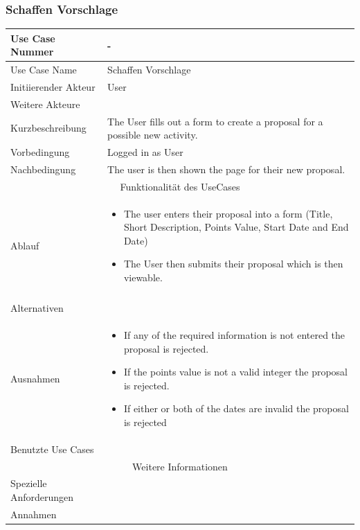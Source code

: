 \documentclass[10pt,a4paper]{article}
\begin{document}
	\subsubsection{Schaffen Vorschlage}
	\begin{tabular}{|l|p{.5\linewidth}|}
	\hline Use Case Nummer & - \\ 
	\hline Use Case Name & Schaffen Vorschlage \\ 
	\hline Initiierender Akteur & User \\
	\hline Weitere Akteure & \\
	\hline Kurzbeschreibung & The User fills out a form to create a proposal for a possible new activity. \\
	\hline Vorbedingung & Logged in as User \\
	\hline Nachbedingung & The user is then shown the page for their new proposal. \\
	\hline \multicolumn{2}{|c|}{Funktionalität des UseCases}\\
	\hline Ablauf & \begin{itemize}
			\item The user enters their proposal into a form (Title, Short Description, Points Value, Start Date and End Date)
			\item The User then submits their proposal which is then viewable.
		\end{itemize} \\ \\
	\hline Alternativen &  \\
	\hline Ausnahmen & \begin{itemize}
			\item If any of the required information is not entered the proposal is rejected.
			\item If the points value is not a valid integer the proposal is rejected.
			\item If either or both of the dates are invalid the proposal is rejected
		\end{itemize} \\
	\hline Benutzte Use Cases &  \\
	\hline \multicolumn{2}{|c|}{Weitere Informationen} \\
	\hline Spezielle Anforderungen &  \\
	\hline Annahmen &  \\
	\hline
	\end{tabular}
	
\end{document}
